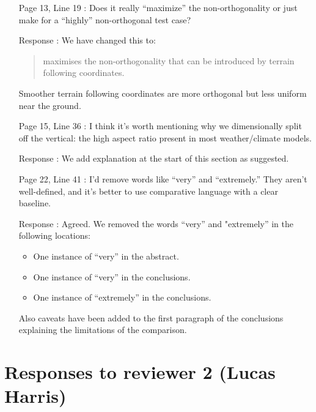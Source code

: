 \documentclass[12pt]{article}
\begin{document}
\begin{enumerate}
\item [Page 13, Line 19]: Does it really ``maximize'' the non-orthogonality or just make for a ``highly'' non-orthogonal test case?

\item [Response]: We have changed this to:
\begin{quote}
maximises the non-orthogonality that can be introduced by terrain following coordinates.
\end{quote}
Smoother terrain following coordinates are more orthogonal but less uniform near the ground. 

\item [Page 15, Line 36]: I think it's worth mentioning why we dimensionally split off the vertical: the high aspect ratio present in most weather/climate models.

\item [Response]: We add explanation at the start of this section as suggested.

\item [Page 22, Line 41]: I'd remove words like ``very'' and ``extremely.'' They aren't well-defined, and it's better to use comparative language with a clear baseline.

\item [Response]: Agreed. We removed the words ``very'' and "extremely'' in the following locations:
\begin{itemize}
\item One instance of  ``very'' in the abstract.
\item One instance of  ``very'' in the conclusions.
\item One instance of  ``extremely'' in the conclusions.
\end{itemize}
Also caveats have been added to the first paragraph of the conclusions explaining the limitations of the comparison.

\end{enumerate}

\section*{Responses to reviewer 2 (Lucas Harris)}
\end{document}
